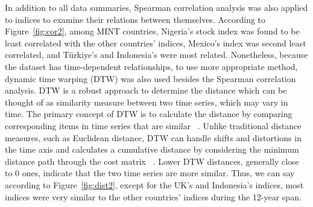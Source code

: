 In addition to all data summaries, Spearman correlation analysis was also applied to indices to examine their relations between themselves. According to Figure~\ref{fig:cor2},  among MINT countries, Nigeria’s stock index was found to be least correlated with the other countries' indices, Mexico's index was second least correlated, and T\"{u}rkiye’s and Indonesia’s were most related. Nonetheless, because the dataset has time-dependent relationships, to use more appropriate method, dynamic time warping (DTW) was also used besides the Spearman correlation analysis. DTW is a robust approach to determine the distance which can be thought of as similarity measure between two time series, which may vary in time. The primary concept of DTW is to calculate the distance by comparing corresponding items in time series that are similar ~\citep{dynamic}. Unlike traditional distance measures, such as Euclidean distance, DTW can handle shifts and distortions in the time axis and calculates a cumulative distance by considering the minimum distance path through the cost matrix ~\citep{muller2007dynamic}. Lower DTW distances, generally close to 0 ones, indicate that the two time series are more similar. Thus, we can say according to Figure~\ref{fig:dist2}, except for the UK's and Indonesia's indices, most indices were very similar to the other countries' indices during the 12-year span.

\begin{table}
    \caption{Variable explanations.}
      \label{tab:variable}
      \centering
\end{table}

